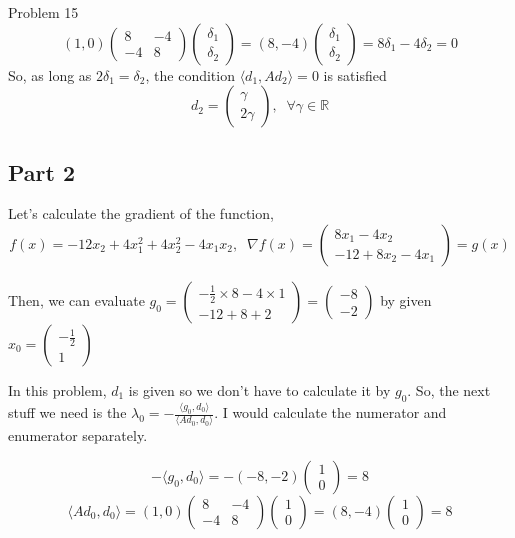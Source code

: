 \documentclass[10pt]{article}
\begin{document}
\begin{section}{Problem 15}
	$$(1,0) \begin{pmatrix}
	8 & -4\\
    -4 & 8 \end{pmatrix} \begin{pmatrix}
	\delta_1\\
     \delta_2 \end{pmatrix} = (8, -4) \begin{pmatrix}
     \delta_1\\
     \delta_2 \end{pmatrix} = 8\delta_1 - 4\delta_2 = 0$$
    So, as long as $2\delta_1 = \delta_2$, the condition $\langle d_1, Ad_2 \rangle = 0$ is satisfied
    $$d_2 = \begin{pmatrix}
    \gamma\\
    2\gamma \end{pmatrix}, \;\; \forall \gamma \in \mathbb{R}$$	
	\subsection{Part 2}
	
	Let's calculate the gradient of the function,
	\[f(x) = -12x_2 + 4x_1^2 + 4x_2^2-4x_1x_2, \;\; \nabla f(x) = \begin{pmatrix}
	8x_1 - 4x_2\\
	-12 + 8x_2 - 4x_1 \end{pmatrix} = g(x)\]
	
	Then, we can evaluate $g_0 = \begin{pmatrix}
	-\frac{1}{2} \times 8 - 4 \times 1\\
	-12 + 8 + 2
	\end{pmatrix} = \begin{pmatrix}
	-8\\
	-2
	\end{pmatrix}$ by given $x_0 = \begin{pmatrix}
	-\frac{1}{2}\\
	1
	\end{pmatrix}$
	
	In this problem, $d_1$ is given so we don't have to calculate it by $g_0$. So, the next stuff we need is the $\lambda_0 = -\frac{ \langle g_0, d_0 \rangle}{\langle Ad_0, d_0\rangle}$. I would calculate the numerator and enumerator separately.
	
	\[-\langle g_0, d_0 \rangle = -(-8, -2) \begin{pmatrix}
	1\\
	0
	\end{pmatrix} = 8\] 
	\[\langle Ad_0, d_0 \rangle  = (1,0) \begin{pmatrix}
	8 & -4\\
	-4 & 8
	\end{pmatrix} \begin{pmatrix}
	1\\
	0
	\end{pmatrix} = (8, -4) \begin{pmatrix}
	1\\
	0
	\end{pmatrix} = 8\]
	

\end{section}
\end{document}
